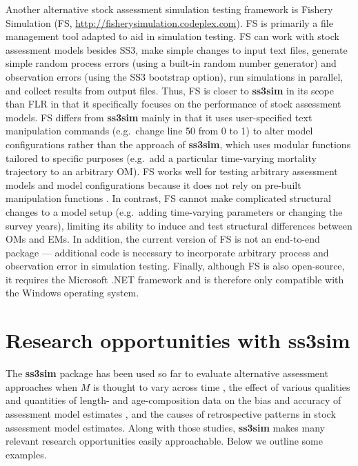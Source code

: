 \documentclass[10pt]{article}
\newcommand{\R}[1]{\label{#1}\linelabel{#1}}
\begin{document}
Another alternative stock assessment simulation testing framework is Fishery
Simulation (FS, \url{http://fisherysimulation.codeplex.com}). FS is primarily a
file management tool adapted to aid in simulation testing. FS can work with
stock assessment models besides SS3, make simple changes to input text files,
generate simple random process errors (using a built-in random number
generator) and observation errors (using the SS3 bootstrap option), run
simulations in parallel, and collect results from output files. Thus, FS is
closer to \textbf{ss3sim} in its scope than FLR in that it specifically focuses
on the performance of stock assessment models. FS differs from \textbf{ss3sim}
mainly in that it uses user-specified text manipulation commands (e.g.~change
line 50 from 0 to 1) to alter model configurations rather than the approach of
\textbf{ss3sim}, which uses modular functions tailored to specific purposes
(e.g.~add a particular time-varying mortality trajectory to an arbitrary OM).
FS works well for testing arbitrary assessment models and model configurations
because it does not rely on pre-built manipulation functions \cite{lee2012,
  piner2011, lee2011}. In contrast, FS cannot make complicated structural
changes to a model setup (e.g.~adding time-varying parameters or changing the
survey years), limiting its ability to induce and test structural differences
between OMs and EMs. In addition, the current version of FS is not an
end-to-end package --- additional code is necessary to incorporate arbitrary
process and observation error in simulation testing. Finally, although FS is
also open-source, it requires the Microsoft .NET framework and is therefore
only compatible with the Windows operating system.

\section*{Research opportunities with ss3sim}

The \textbf{ss3sim} package has been used so far to evaluate alternative
assessment approaches when $M$ is thought to vary across time
\cite{johnson2014}, the \R{B25}effect of various qualities and quantities of
length- and age-composition data on the bias and accuracy of assessment model
estimates \cite{ono2014}, and the causes of retrospective patterns in stock
assessment model estimates. Along with those studies, \textbf{ss3sim} makes
many relevant research opportunities easily approachable. Below we outline some
examples.
\end{document}
